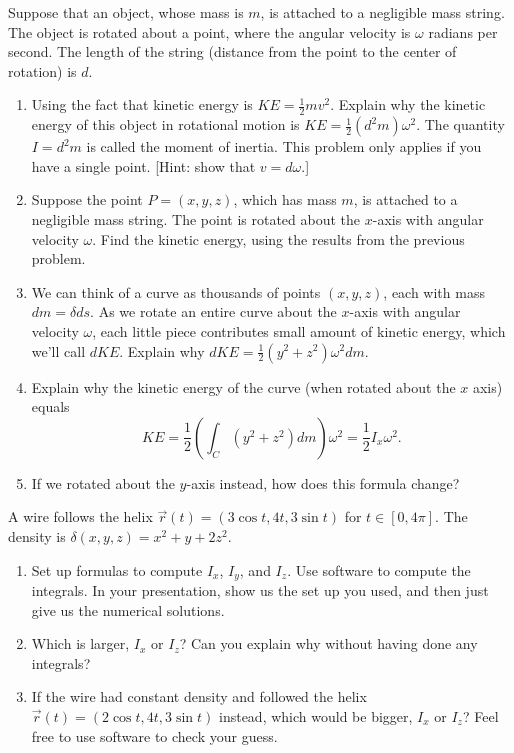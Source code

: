 \begin{problem}%
%
 Suppose that an object, whose mass is $m$, is attached to a negligible mass string. The object is rotated about a point, where the angular velocity is $\omega$ radians per second. The length of the string (distance from the point to the center of rotation) is $d$.
 \begin{enumerate}
  \item  Using the fact that kinetic energy is $KE=\frac{1}{2}mv^2$. Explain why the kinetic energy of this object in rotational motion is $KE = \frac{1}{2}(d^2m)\omega^2$.  The quantity $I=d^2m$ is called the moment of inertia. This problem only applies if you have a single point. [Hint: show that $v=d\omega$.]
  \item Suppose the point $P=(x,y,z)$, which has mass $m$, is attached to a negligible mass string. The point is rotated about the $x$-axis with angular velocity $\omega$. Find the kinetic energy, using the results from the previous problem.
  \item We can think of a curve as thousands of points $(x,y,z)$, each with mass $dm=\delta ds$. As we rotate an entire curve about the $x$-axis with angular velocity $\omega$, each little piece contributes small amount of kinetic energy, which we'll call $dKE$.  Explain why $dKE = \frac{1}{2}(y^2+z^2) \omega^2 dm$.
  \item Explain why the kinetic energy of the curve (when rotated about the $x$ axis) equals 
$$KE= \frac{1}{2}\left(\int_C (y^2+z^2)dm\right)\omega^2=\frac{1}{2}I_x\omega^2.$$
  \item If we rotated about the $y$-axis instead, how does this formula change?
 \end{enumerate}
\end{problem}

\begin{problem}
 A wire follows the helix $\vec r(t) = (3\cos t, 4t, 3\sin t)$ for $t\in[0,4\pi]$. The density is $\delta(x,y,z) = x^2+y+2z^2$. 
\begin{enumerate}
 \item Set up formulas to compute $I_x$, $I_y$, and $I_z$. Use software to compute the integrals. In your presentation, show us the set up you used, and then just give us the numerical solutions. 
 \item Which is larger, $I_x$ or $I_z$? Can you explain why without having done any integrals?
 \item If the wire had constant density and followed the helix $\vec r(t) = (2\cos t, 4t, 3\sin t)$ instead, which would be bigger, $I_x$ or $I_z$?  Feel free to use software to check your guess. 
\end{enumerate}
\end{problem}


